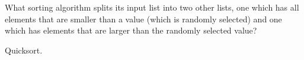 What sorting algorithm splits its input list into two other lists, one which has all elements that are smaller than a value (which is randomly
      selected) and one which has elements that are larger than the
      randomly selected value?

    \begin{answer}
    Quicksort.
    \end{answer}